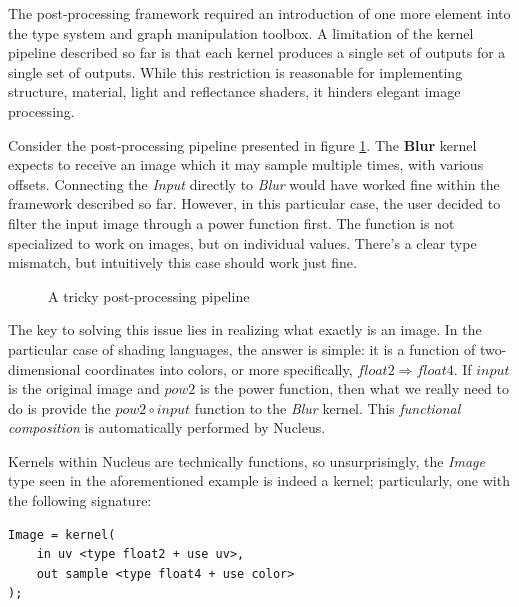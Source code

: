 
The post-processing framework required an introduction of one more element into the type system and graph manipulation toolbox. A limitation of the kernel pipeline described so far is that each kernel produces a single set of outputs for a single set of outputs. While this restriction is reasonable for implementing structure, material, light and reflectance shaders, it hinders elegant image processing.

Consider the post-processing pipeline presented in figure \ref{fig:TrickyPostProc}. The \textbf{Blur} kernel expects to receive an image which it may sample multiple times, with various offsets. Connecting the \emph{Input} directly to \emph{Blur} would have worked fine within the framework described so far. However, in this particular case, the user decided to filter the input image through a power function first. The function is not specialized to work on images, but on individual values. There's a clear type mismatch, but intuitively this case should work just fine.

\begin{figure}[h!]
  \centering
    \caption[A tricky post-processing pipeline]{A tricky post-processing pipeline}
  \label{fig:TrickyPostProc}
\end{figure}

The key to solving this issue lies in realizing what exactly is an image. In the particular case of shading languages, the answer is simple: it is a function of two-dimensional coordinates into colors, or more specifically, $float2 \Rightarrow float4$. If $input$ is the original image and $pow2$ is the power function, then what we really need to do is provide the $pow2 \circ input$ function to the \emph{Blur} kernel. This \emph{functional composition} is automatically performed by Nucleus.

Kernels within Nucleus are technically functions, so unsurprisingly, the \emph{Image} type seen in the aforementioned example is indeed a kernel; particularly, one with the following signature:
	
\begin{lstlisting}[frame=single]
Image = kernel(
    in uv <type float2 + use uv>,
    out sample <type float4 + use color>
);
\end{lstlisting}

